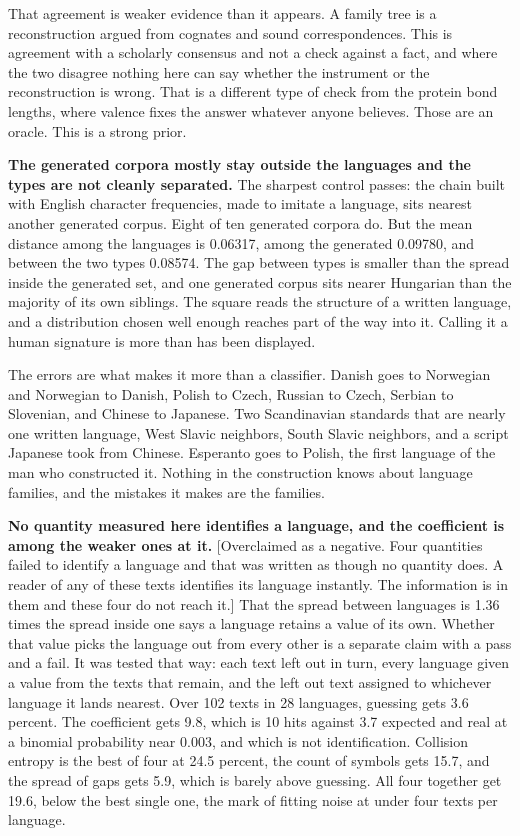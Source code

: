 That agreement is weaker evidence than it appears. A family tree is a reconstruction argued from cognates and sound correspondences. This is agreement with a scholarly consensus and not a check against a fact, and where the two disagree nothing here can say whether the instrument or the reconstruction is wrong. That is a different type of check from the protein bond lengths, where valence fixes the answer whatever anyone believes. Those are an oracle. This is a strong prior.

\textbf{The generated corpora mostly stay outside the languages and the types are not cleanly separated.} The sharpest control passes: the chain built with English character frequencies, made to imitate a language, sits nearest another generated corpus. Eight of ten generated corpora do. But the mean distance among the languages is 0.06317, among the generated 0.09780, and between the two types 0.08574. The gap between types is smaller than the spread inside the generated set, and one generated corpus sits nearer Hungarian than the majority of its own siblings. The square reads the structure of a written language, and a distribution chosen well enough reaches part of the way into it. Calling it a human signature is more than has been displayed.

The errors are what makes it more than a classifier. Danish goes to Norwegian and Norwegian to Danish, Polish to Czech, Russian to Czech, Serbian to Slovenian, and Chinese to Japanese. Two Scandinavian standards that are nearly one written language, West Slavic neighbors, South Slavic neighbors, and a script Japanese took from Chinese. Esperanto goes to Polish, the first language of the man who constructed it. Nothing in the construction knows about language families, and the mistakes it makes are the families.

\textbf{No quantity measured here identifies a language, and the coefficient is among the weaker ones at it.} [Overclaimed as a negative. Four quantities failed to identify a language and that was written as though no quantity does. A reader of any of these texts identifies its language instantly. The information is in them and these four do not reach it.] That the spread between languages is 1.36 times the spread inside one says a language retains a value of its own. Whether that value picks the language out from every other is a separate claim with a pass and a fail. It was tested that way: each text left out in turn, every language given a value from the texts that remain, and the left out text assigned to whichever language it lands nearest. Over 102 texts in 28 languages, guessing gets 3.6 percent. The coefficient gets 9.8, which is 10 hits against 3.7 expected and real at a binomial probability near 0.003, and which is not identification. Collision entropy is the best of four at 24.5 percent, the count of symbols gets 15.7, and the spread of gaps gets 5.9, which is barely above guessing. All four together get 19.6, below the best single one, the mark of fitting noise at under four texts per language.

